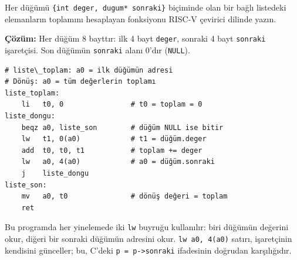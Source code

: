 \begin{ornek}[4.13]
\label{orn:bagli-liste}
Her düğümü \texttt{\{int deger, dugum* sonraki\}} biçiminde olan bir bağlı listedeki elemanların toplamını hesaplayan fonksiyonu RISC-V çevirici dilinde yazın.

\textbf{Çözüm:} Her düğüm 8 bayttır: ilk 4 bayt \texttt{deger}, sonraki 4 bayt \texttt{sonraki} işaretçisi. Son düğümün \texttt{sonraki} alanı 0'dır (\texttt{NULL}).

\begin{lstlisting}[style=riscv]
# liste\_toplam: a0 = ilk düğümün adresi
# Dönüş: a0 = tüm değerlerin toplamı
liste_toplam:
    li   t0, 0                # t0 = toplam = 0
liste_dongu:
    beqz a0, liste_son        # düğüm NULL ise bitir
    lw   t1, 0(a0)            # t1 = düğüm.deger
    add  t0, t0, t1           # toplam += deger
    lw   a0, 4(a0)            # a0 = düğüm.sonraki
    j    liste_dongu
liste_son:
    mv   a0, t0               # dönüş değeri = toplam
    ret
\end{lstlisting}

Bu programda her yinelemede iki \texttt{lw} buyruğu kullanılır: biri düğümün değerini okur, diğeri bir sonraki düğümün adresini okur. \texttt{lw a0, 4(a0)} satırı, işaretçinin kendisini günceller; bu, C'deki \texttt{p = p->sonraki} ifadesinin doğrudan karşılığıdır.
\end{ornek}

